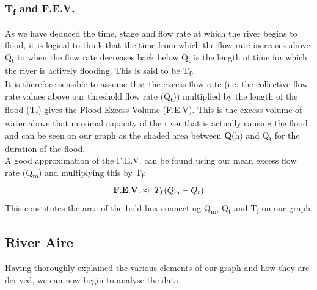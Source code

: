 \documentclass[11 pt, a4paper]{article}
\begin{document}
\subsubsection{T\textsubscript{f} and F.E.V.}
As we have deduced the time, stage and flow rate at which the river begins to flood, it is logical to think that the time from which the flow rate increases above Q\textsubscript{t} to when the flow rate decreases back below Q\textsubscript{t} is the length of time for which the river is actively flooding. This is said to be T\textsubscript{f}.\\ 
It is therefore sensible to assume that the excess flow rate (i.e. the collective flow rate values above our threshold flow rate (Q\textsubscript{t})) multiplied by the length of the flood (T\textsubscript{f}) gives the Flood Excess Volume (F.E.V). This is the excess volume of water above that maximal capacity of the river that is actually causing the flood and can be seen on our graph as the shaded area between {\bf Q}(h) and Q\textsubscript{t} for the duration of the flood.\\
A good approximation of the F.E.V. can be found using our mean excess flow rate (Q\textsubscript{m}) and multiplying this by T\textsubscript{f}:
\[{\bf F.E.V.}\approx\ T_f (Q_m - Q_t)\]
This constitutes the area of the bold box connecting Q\textsubscript{m}, Q\textsubscript{t} and T\textsubscript{f} on our graph.

\subsection{River Aire}
Having thoroughly explained the various elements of our graph and how they are derived, we can now begin to analyse the data.
\end{document}
